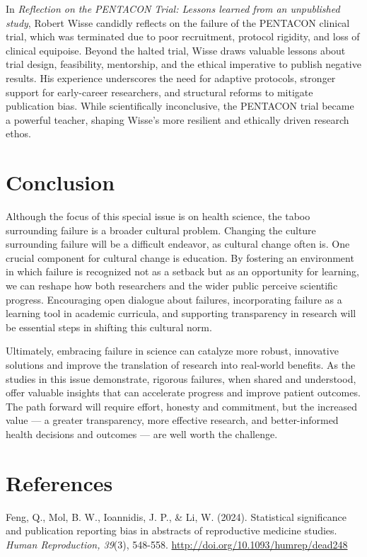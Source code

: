 \documentclass[authordate, empirical, issue]{jote-new-article}
\begin{document}
	In \emph{Reflection on the PENTACON Trial: Lessons learned from an unpublished study}, Robert Wisse candidly reflects on the failure of the PENTACON clinical trial, which was terminated due to poor recruitment, protocol rigidity, and loss of clinical equipoise. Beyond the halted trial, Wisse draws valuable lessons about trial design, feasibility, mentorship, and the ethical imperative to publish negative results. His experience underscores the need for adaptive protocols, stronger support for early-career researchers, and structural reforms to mitigate publication bias. While scientifically inconclusive, the PENTACON trial became a powerful teacher, shaping Wisse's more resilient and ethically driven research ethos.







	\section{Conclusion}
	Although the focus of this special issue is on health science, the taboo surrounding failure is a broader cultural problem. Changing the culture surrounding failure will be a difficult endeavor, as cultural change often is. One crucial component for cultural change is education. By fostering an environment in which failure is recognized not as a setback but as an opportunity for learning, we can reshape how both researchers and the wider public perceive scientific progress. Encouraging open dialogue about failures, incorporating failure as a learning tool in academic curricula, and supporting transparency in research will be essential steps in shifting this cultural norm.



	Ultimately, embracing failure in science can catalyze more robust, innovative solutions and improve the translation of research into real-world benefits. As the studies in this issue demonstrate, rigorous failures, when shared and understood, offer valuable insights that can accelerate progress and improve patient outcomes. The path forward will require effort, honesty and commitment, but the increased value — a greater transparency, more effective research, and better-informed health decisions and outcomes — are well worth the challenge.
	
	\section{References}
	Feng, Q., Mol, B. W., Ioannidis, J. P., \& Li, W. (2024). Statistical significance and publication reporting bias in abstracts of reproductive medicine studies. \emph{Human Reproduction, 39}(3), 548-558. \url{http://doi.org/10.1093/humrep/dead248}
	
\end{document}
